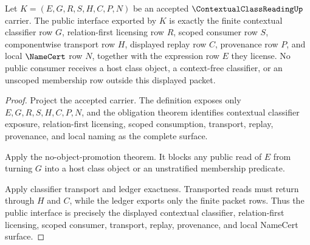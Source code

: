 \begin{theorem}
\label{thm:contextual-class-reading-public-interface-export}
Let $K=(E,G,R,S,H,C,P,N)$ be an accepted $\ContextualClassReadingUp$ carrier. The public interface exported by $K$ is exactly the finite contextual classifier row $G$, relation-first licensing row $R$, scoped consumer row $S$, componentwise transport row $H$, displayed replay row $C$, provenance row $P$, and local $\NameCert$ row $N$, together with the expression row $E$ they license. No public consumer receives a host class object, a context-free classifier, or an unscoped membership row outside this displayed packet.
\end{theorem}
\begin{proof}
Project the accepted carrier. The definition exposes only $E,G,R,S,H,C,P,N$, and the obligation theorem identifies contextual classifier exposure, relation-first licensing, scoped consumption, transport, replay, provenance, and local naming as the complete surface.

Apply the no-object-promotion theorem. It blocks any public read of $E$ from turning $G$ into a host class object or an unstratified membership predicate.

Apply classifier transport and ledger exactness. Transported reads must return through $H$ and $C$, while the ledger exports only the finite packet rows. Thus the public interface is precisely the displayed contextual classifier, relation-first licensing, scoped consumer, transport, replay, provenance, and local NameCert surface.
\end{proof}


